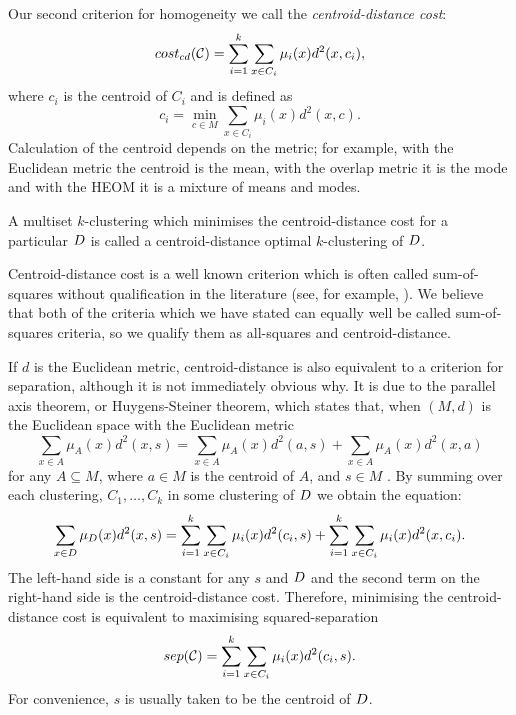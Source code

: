 Our second criterion for homogeneity we call the \textit{centroid-distance
  cost}:
\begin{equation}
  \label{eq:CDC}
  cost_{cd}(\mathcal{C}) = \sum_{i=1}^{k} \sum_{x \in C_i} \mu_i(x) d^2(x,c_i),
\end{equation}
where $c_i$ is the centroid of $C_i$ and is defined as
\begin{equation*}
  c_i = \min_{c \in M} \sum_{x \in C_i} \mu_i(x) d^2(x,c).
\end{equation*}
Calculation of the centroid depends on the metric; for example, with the
Euclidean metric the centroid is the mean, with the overlap metric it is the
mode and with the HEOM it is a mixture of means and modes.

\begin{dfn}
  A multiset $k$-clustering which minimises the centroid-distance cost for a
  particular $D$ is called a centroid-distance optimal $k$-clustering of
  $D$.
\end{dfn}

Centroid-distance cost is a well known criterion which is often called
sum-of-squares without qualification in the literature (see, for example,
\citep{aloise09,merle1999interior,spath80,jain-1999,hansen1997mathprog}).  We
believe that both of the criteria which we have stated can equally well be
called sum-of-squares criteria, so we qualify them as all-squares and
centroid-distance.

If $d$ is the Euclidean metric, centroid-distance is also equivalent to a
criterion for separation, although it is not immediately obvious why.  It is
due to the parallel axis theorem, or Huygens-Steiner theorem, which states
that, when $(M,d)$ is the Euclidean space with the Euclidean
metric
\begin{equation}
  \label{eq:huygens}
  \sum_{x \in A} \mu_A(x) d^2(x,s)
  = \sum_{x \in A} \mu_A(x) d^2(a,s)
  + \sum_{x \in A} \mu_A(x) d^2(x,a)
\end{equation}
for any $A \subseteq M$, where $a \in M$ is the centroid of $A$, and $s \in M$
\citep{spath80}.  By summing over each clustering, $C_1,\dotsc,C_k$ in some
clustering of $D$ we obtain the equation:
\begin{equation}
  \label{eq:cd-sep-eq}
  \sum_{x \in D} \mu_{D}(x) d^2(x,s)
  = \sum_{i=1}^{k} \sum_{x \in C_i} \mu_i(x) d^2(c_i,s)
  + \sum_{i=1}^{k} \sum_{x \in C_i} \mu_i(x) d^2(x,c_i).
\end{equation}
The left-hand side is a constant for any $s$ and $D$ and the second term
on the right-hand side is the centroid-distance cost.  Therefore, minimising
the centroid-distance cost is equivalent to maximising squared-separation
\begin{equation*}
  sep(\mathcal{C}) = \sum_{i=1}^{k} \sum_{x \in C_i} \mu_i(x) d^2(c_i,s).
\end{equation*}
For convenience, $s$ is usually taken to be the centroid of $D$.

